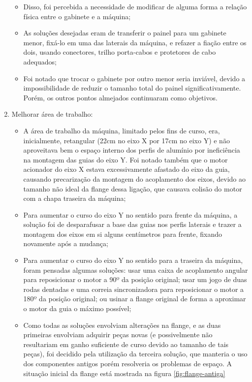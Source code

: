 \documentclass[
	article,			%
	11pt,				%
	oneside,			%
	a4paper,			%
	section=TITLE,		%
	english,			%
	brazil,				%
	sumario=tradicional
	]{abntex2}
\begin{document}
\begin{enumerate}
\begin{itemize}
        \item Disso, foi percebida a necessidade de modificar de alguma forma a relação física entre o gabinete e a máquina;
        \item As soluções desejadas eram de transferir o painel para um gabinete menor, fixá-lo em uma das laterais da máquina, e refazer a fiação entre os dois, usando conectores, trilho porta-cabos e protetores de cabo adequados;
        \item Foi notado que trocar o gabinete por outro menor seria inviável, devido a impossibilidade de reduzir o tamanho total do painel significativamente. Porém, os outros pontos almejados continuaram como objetivos.
    \end{itemize} 
    \item Melhorar área de trabalho:
    \label{subsec:curso}
    \begin{itemize}
        \item A área de trabalho da máquina, limitado pelos fins de curso, era, inicialmente, retangular (22cm no eixo X por 17cm no eixo Y) e não aproveitava bem o espaço interno dos perfis de alumínio por ineficiência na montagem das guias do eixo Y. Foi notado também que o motor acionador do eixo X estava excessivamente afastado do eixo da guia, causando precarização da montagem do acoplamento dos eixos, devido ao tamanho não ideal da flange dessa ligação, que causava colisão do motor com a chapa traseira da máquina;
        \item Para aumentar o curso do eixo Y no sentido para frente da máquina, a solução foi de desparafusar a base das guias nos perfis laterais e trazer a montagem dos eixos em si alguns centímetros para frente, fixando novamente após a mudança;
        \item Para aumentar o curso do eixo Y no sentido para a traseira da máquina, foram pensadas algumas soluções: usar uma caixa de acoplamento angular para reposicionar o motor a 90º da posição original; usar um jogo de duas rodas dentadas e uma correia sincronizadora para reposicionar o motor a 180º da posição original; ou usinar a flange original de forma a aproximar o motor da guia o máximo possível;
        \item Como todas as soluções envolviam alterações na flange, e as duas primeiras envolviam adquirir peças novas (e possivelmente não resultariam em ganho suficiente de curso devido ao tamanho de tais peças), foi decidido pela utilização da terceira solução, que manteria o uso dos componentes antigos porém resolveria os problemas de espaço. A situação inicial da flange está mostrada na figura \ref{fig:flange-antiga}

\end{itemize}
\end{enumerate}
\end{document}
